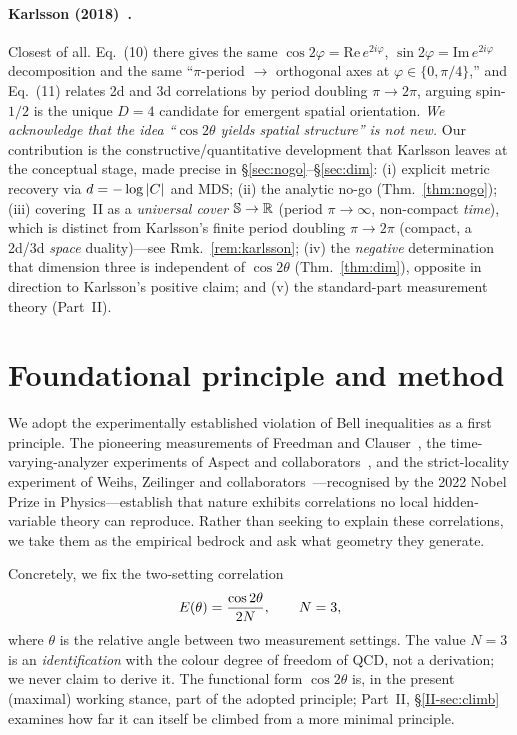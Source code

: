 \documentclass[11pt]{article}
\begin{document}
\paragraph{Karlsson (2018)~\cite{karlsson}.} Closest of all. Eq.~(10) there gives the
same $\cos2\varphi=\mathrm{Re}\,e^{2i\varphi}$, $\sin2\varphi=\mathrm{Im}\,e^{2i\varphi}$
decomposition and the same ``$\pi$-period $\to$ orthogonal axes at $\varphi\in\{0,\pi/4\}$,''
and Eq.~(11) relates 2d and 3d correlations by period doubling $\pi\to2\pi$, arguing
spin-$1/2$ is the unique $D{=}4$ candidate for emergent spatial orientation.
\emph{We acknowledge that the idea ``$\cos2\theta$ yields spatial structure'' is not new.}
Our contribution is the constructive/quantitative development that Karlsson leaves at
the conceptual stage, made precise in \S\ref{sec:nogo}--\S\ref{sec:dim}:
(i) explicit metric recovery via $d=-\log|C|$ and MDS;
(ii) the analytic no-go (Thm.~\ref{thm:nogo});
(iii) covering~II as a \emph{universal cover} $\mathbb{S}\to\mathbb{R}$ (period $\pi\to\infty$,
non-compact \emph{time}), which is distinct from Karlsson's finite period doubling
$\pi\to2\pi$ (compact, a 2d/3d \emph{space} duality)---see Rmk.~\ref{rem:karlsson};
(iv) the \emph{negative} determination that dimension three is independent of
$\cos2\theta$ (Thm.~\ref{thm:dim}), opposite in direction to Karlsson's positive
claim; and (v) the standard-part measurement theory (Part~II).

\section{Foundational principle and method}\label{sec:principle}
\established

We adopt the experimentally established violation of Bell inequalities as a first
principle. The pioneering measurements of Freedman and Clauser~\cite{freedman-clauser},
the time-varying-analyzer experiments of Aspect and
collaborators~\cite{aspect1982,aspect1982tv}, and the strict-locality experiment of
Weihs, Zeilinger and collaborators~\cite{weihs-zeilinger}---recognised by the 2022
Nobel Prize in Physics---establish that nature exhibits correlations no local
hidden-variable theory can reproduce. Rather than seeking to explain these correlations,
we take them as the empirical bedrock and ask what geometry they generate.

Concretely, we fix the two-setting correlation
\begin{equation}
E(\theta)=\frac{\cos 2\theta}{2N},\qquad N=3,
\label{eq:bell}
\end{equation}
where $\theta$ is the relative angle between two measurement settings. The value $N=3$ is
an \emph{identification} with the colour degree of freedom of QCD, not a derivation; we
never claim to derive it. The functional form $\cos2\theta$ is, in the present (maximal)
working stance, part of the adopted principle; Part~II, \S\ref{II-sec:climb} examines how far
it can itself be climbed from a more minimal principle.
\end{document}
